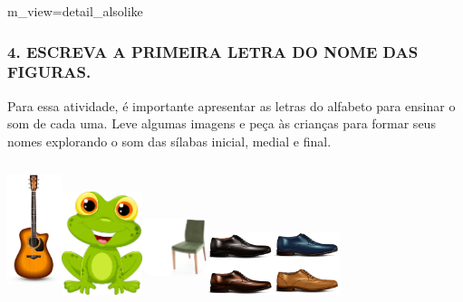 m\_view=detail\_alsolike

\subsubsection{4. ESCREVA A PRIMEIRA LETRA DO NOME DAS
FIGURAS.}\label{escreva-a-primeira-letra-do-nome-das-figuras.}

Para essa atividade, é importante apresentar as letras do alfabeto para
ensinar o som de cada uma. Leve algumas imagens e peça às
crianças para formar seus nomes explorando o som das sílabas inicial, medial e
final.

\includegraphics[width=0.62222in,height=1.51597in]{media/image9.png}\includegraphics[width=0.92986in,height=1.19236in]{media/image10.png}\includegraphics[width=0.74583in,height=1.09722in]{media/image11.png}\includegraphics[width=1.52708in,height=0.72014in]{media/image12.png}

